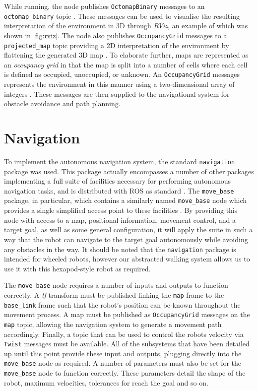 While running, the node publishes \texttt{OctomapBinary} messages to an \texttt{octomap\_binary} topic \cite{ros_wiki_octomap_server}. These messages can be used to visualise the resulting interpretation of the environment in 3D through \emph{RViz}, an example of which was shown in \autoref{fig:rviz}. The node also publishes \texttt{OccupancyGrid} messages to a \texttt{projected\_map} topic providing a 2D interpretation of the environment by flattening the generated 3D map \cite{ros_wiki_octomap_server}. To elaborate further, maps are represented as an \emph{occupancy grid} in that the map is split into a number of cells where each cell is defined as occupied, unoccupied, or unknown. An \texttt{OccupancyGrid} messages represents the environment in this manner using a two-dimensional array of integers \cite{ros_api_og_msg}. These messages are then supplied to the navigational system for obstacle avoidance and path planning.


\section{Navigation}

To implement the autonomous navigation system, the standard \texttt{navigation} package was used. This package actually encompasses a number of other packages implementing a full suite of facilities necessary for performing autonomous navigation tasks, and is distributed with ROS as standard \cite{ros_wiki_nav}. The \texttt{move\_base} package, in particular, which contains a similarly named \texttt{move\_base} node which provides a single simplified access point to these facilities \cite{ros_wiki_nav_base}. By providing this node with access to a map, positional information, movement control, and a target goal, as well as some general configuration, it will apply the suite in such a way that the robot can navigate to the target goal autonomously while avoiding any obstacles in the way. It should be noted that the \texttt{navigation} package is intended for wheeled robots, however our abstracted walking system allows us to use it with this hexapod-style robot as required.

The \texttt{move\_base} node requires a number of inputs and outputs to function correctly. A \emph{tf} transform must be published linking the \texttt{map} frame to the \texttt{base\_link} frame such that the robot's position can be known throughout the movement process. A map must be published as \texttt{OccupancyGrid} messages on the \texttt{map} topic, allowing the navigation system to generate a movement path accordingly. Finally, a topic that can be used to control the robots velocity via \texttt{Twist} messages must be available. All of the subsystems that have been detailed up until this point provide these input and outputs, plugging directly into the \texttt{move\_base} node as required. A number of parameters must also be set for the \texttt{move\_base} node to function correctly. These parameters detail the shape of the robot, maximum velocities, tolerances for reach the goal and so on.

